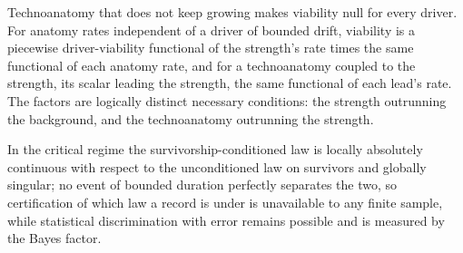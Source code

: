 \begin{theorem}
\label{imp:twocond}
Technoanatomy that does not keep growing makes viability null for every
driver. For anatomy rates independent of a driver of bounded drift,
viability is a piecewise driver-viability functional of the strength's
rate times the same functional of each anatomy rate, and for a
technoanatomy coupled to the strength, its scalar leading the strength,
the same functional of each lead's rate. The factors are logically
distinct necessary conditions: the strength outrunning the background,
and the technoanatomy outrunning the strength.
\end{theorem}

\begin{theorem}
\label{imp:ceiling}
In the critical regime the survivorship-conditioned law is locally
absolutely continuous with respect to the unconditioned law on survivors
and globally singular; no event of bounded duration perfectly separates
the two, so certification of which law a record is under is unavailable
to any finite sample, while statistical discrimination with error remains
possible and is measured by the Bayes factor.
\end{theorem}

